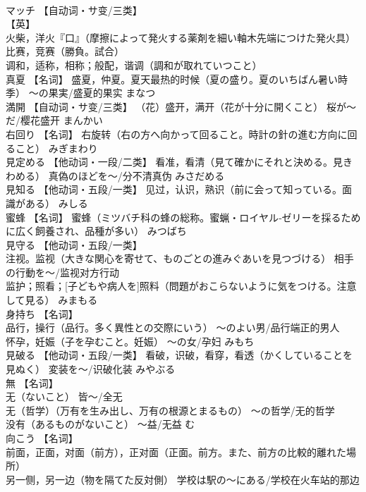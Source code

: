\documentclass[8pt]{extreport}
\begin{document}
\begin{CJK}{UTF8}{min}
\\	マッチ	【自动词・サ变/三类】 
\\	【英】
\\	火柴，洋火『口』（摩擦によって発火する薬剤を細い軸木先端につけた発火具） 
\\	比赛，竞赛（勝負。試合） 
\\	调和，适称，相称；般配，谐调（調和が取れていつこと）		
\\	真夏	【名词】 盛夏，仲夏。夏天最热的时候（夏の盛り。夏のいちばん暑い時季） ～の果実/盛夏的果实	まなつ	
\\	満開	【自动词・サ变/三类】 （花）盛开，满开（花が十分に開くこと） 桜が～だ/樱花盛开	まんかい	
\\	右回り	【名词】 右旋转（右の方へ向かって回ること。時計の針の進む方向に回ること）	みぎまわり	
\\	見定める	【他动词・一段/二类】 看准，看清（見て確かにそれと決める。見きわめる） 真偽のほどを～/分不清真伪	みさだめる	
\\	見知る	【他动词・五段/一类】 见过，认识，熟识（前に会って知っている。面識がある）	みしる	
\\	蜜蜂	【名词】 蜜蜂（ミツバチ科の蜂の総称。蜜蝋・ロイヤル‐ゼリーを採るために広く飼養され、品種が多い）	みつばち	
\\	見守る	【他动词・五段/一类】 
\\	注视。监视（大きな関心を寄せて、ものごとの進みぐあいを見つづける） 相手の行動を～/监视对方行动 
\\	监护；照看；[子どもや病人を]照料（問題がおこらないように気をつける。注意して見る）	みまもる	
\\	身持ち	【名词】 
\\	品行，操行（品行。多く異性との交際にいう） ～のよい男/品行端正的男人 
\\	怀孕，妊娠（子を孕むこと。妊娠） ～の女/孕妇	みもち	
\\	見破る	【他动词・五段/一类】 看破，识破，看穿，看透（かくしていることを見ぬく） 変装を～/识破化装	みやぶる	
\\	無	【名词】 
\\	无（ないこと） 皆～/全无 
\\	无（哲学）（万有を生み出し、万有の根源とまるもの） ～の哲学/无的哲学 
\\	没有（あるものがないこと） ～益/无益	む	
\\	向こう	【名词】 
\\	前面，正面，对面（前方），正对面（正面。前方。また、前方の比較的離れた場所） 
\\	另一侧，另一边（物を隔てた反対側） 学校は駅の～にある/学校在火车站的那边 

\end{CJK}
\end{document}
